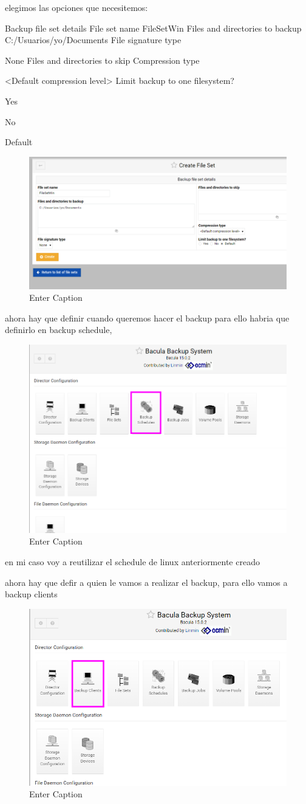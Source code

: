 elegimos las opciones que necesitemos:

Backup file set details
File set name
FileSetWin
Files and directories to backup
C:/Usuarios/yo/Documents
File signature type

None
Files and directories to skip
Compression type

<Default compression level>
Limit backup to one filesystem?

  Yes 
 
  No 
 
  Default 

\begin{figure}[H]
    \centering
    \includegraphics[width=0.5\linewidth]{instalacionBacula/filesetWindows.png}
    \caption{Enter Caption}
\end{figure}


ahora hay que definir cuando queremos hacer el backup
para ello habria que definirlo en backup schedule, 

\begin{figure}[H]
    \centering
    \includegraphics[width=0.5\linewidth]{instalacionBacula/schedule.png}
    \caption{Enter Caption}
\end{figure}

en mi caso voy a reutilizar el schedule de linux anteriormente creado


ahora hay que defir a quien le vamos a realizar el backup, para ello vamos a backup clients

\begin{figure}[H]
    \centering
    \includegraphics[width=0.5\linewidth]{instalacionBacula/asdasdas.png}
    \caption{Enter Caption}
\end{figure}

